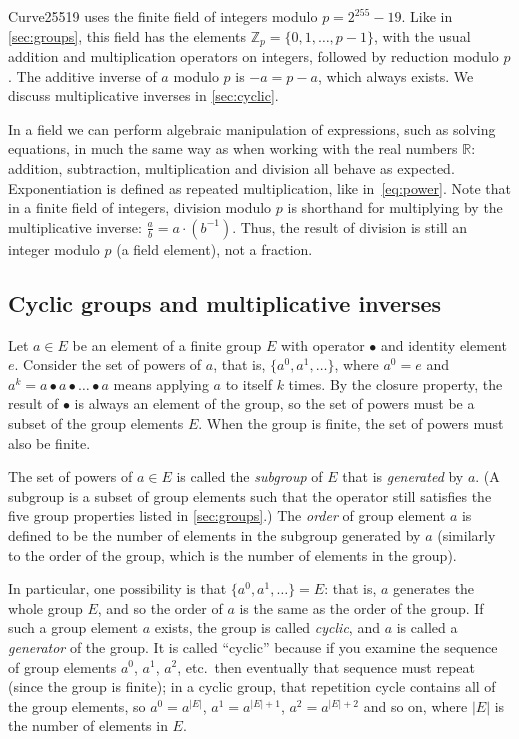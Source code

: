 \documentclass[manuscript]{acmart}
\begin{document}
Curve25519 uses the finite field of integers modulo $p = 2^{255}-19$.
Like in \autoref{sec:groups}, this field has the elements $\mathbb{Z}_p = \{0, 1, \dots, p-1\}$, with the usual addition and multiplication operators on integers, followed by reduction modulo $p$.
The additive inverse of $a$ modulo $p$ is $-a = p - a$, which always exists.
We discuss multiplicative inverses in \autoref{sec:cyclic}.

In a field we can perform algebraic manipulation of expressions, such as solving equations, in much the same way as when working with the real numbers $\mathbb{R}$: addition, subtraction, multiplication and division all behave as expected.
Exponentiation is defined as repeated multiplication, like in~\eqref{eq:power}.
Note that in a finite field of integers, division modulo $p$ is shorthand for multiplying by the multiplicative inverse: $\frac{a}{b} = a \cdot (b^{-1})$.
Thus, the result of division is still an integer modulo $p$ (a field element), not a fraction.

\subsection{Cyclic groups and multiplicative inverses}\label{sec:cyclic}

Let $a \in E$ be an element of a finite group $E$ with operator $\bullet$ and identity element $e$.
Consider the set of powers of $a$, that is, $\{a^0, a^1, \dots\}$, where $a^0 = e$ and $a^k = a \bullet a \bullet \dots \bullet a$ means applying $a$ to itself $k$ times.
By the closure property, the result of $\bullet$ is always an element of the group, so the set of powers must be a subset of the group elements $E$.
When the group is finite, the set of powers must also be finite.

The set of powers of $a \in E$ is called the \emph{subgroup} of $E$ that is \emph{generated} by $a$.
(A subgroup is a subset of group elements such that the operator still satisfies the five group properties listed in \autoref{sec:groups}.)
The \emph{order} of group element $a$ is defined to be the number of elements in the subgroup generated by $a$ (similarly to the order of the group, which is the number of elements in the group).

In particular, one possibility is that $\{a^0, a^1, \dots\} = E$: that is, $a$ generates the whole group $E$, and so the order of $a$ is the same as the order of the group.
If such a group element $a$ exists, the group is called \emph{cyclic}, and $a$ is called a \emph{generator} of the group.
It is called ``cyclic'' because if you examine the sequence of group elements $a^0$, $a^1$, $a^2$, etc.\ then eventually that sequence must repeat (since the group is finite); in a cyclic group, that repetition cycle contains all of the group elements, so $a^0 = a^{|E|}$, $a^1 = a^{|E|+1}$, $a^2 = a^{|E|+2}$ and so on, where $|E|$ is the number of elements in $E$.
\end{document}
